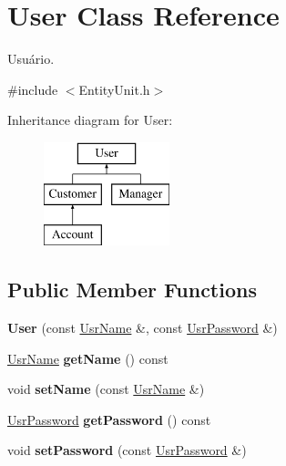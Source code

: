 \hypertarget{classUser}{\section{User Class Reference}
\label{classUser}
}


Usuário.  




{\ttfamily \#include $<$Entity\-Unit.\-h$>$}

Inheritance diagram for User\-:\begin{figure}[H]
\begin{center}
\leavevmode
\includegraphics[height=3.000000cm]{classUser}
\end{center}
\end{figure}
\subsection*{Public Member Functions}
\begin{DoxyCompactItemize}
\item 
\hypertarget{classUser_a550edb2b7dae1148df00157962f4cbce}{{\bfseries User} (const \hyperlink{classUsrName}{Usr\-Name} \&, const \hyperlink{classUsrPassword}{Usr\-Password} \&)}\label{classUser_a550edb2b7dae1148df00157962f4cbce}

\item 
\hypertarget{classUser_ae1dd9bb1a02ea1aa4246da19c28cd831}{\hyperlink{classUsrName}{Usr\-Name} {\bfseries get\-Name} () const }\label{classUser_ae1dd9bb1a02ea1aa4246da19c28cd831}

\item 
\hypertarget{classUser_a3a25b1b158ff07d1349d1d3019c7c0c0}{void {\bfseries set\-Name} (const \hyperlink{classUsrName}{Usr\-Name} \&)}\label{classUser_a3a25b1b158ff07d1349d1d3019c7c0c0}

\item 
\hypertarget{classUser_a799c61fc6ff206a1b1edbc86d61989ed}{\hyperlink{classUsrPassword}{Usr\-Password} {\bfseries get\-Password} () const }\label{classUser_a799c61fc6ff206a1b1edbc86d61989ed}

\item 
\hypertarget{classUser_a524865340fb55a6bdc983143cc82fd5d}{void {\bfseries set\-Password} (const \hyperlink{classUsrPassword}{Usr\-Password} \&)}\label{classUser_a524865340fb55a6bdc983143cc82fd5d}

\end{DoxyCompactItemize}


